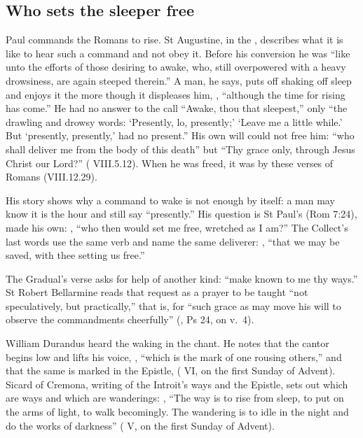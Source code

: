 \subsection{Who sets the sleeper free}

Paul commands the Romans to rise. St Augustine, in the ,
describes what it is like to hear such a command and not obey it. Before his
conversion he was ``like unto the efforts of those desiring to awake, who,
still overpowered with a heavy drowsiness, are again steeped therein.'' A man,
he says, puts off shaking off sleep and enjoys it the more though it
displeases him, , ``although the
time for rising has come.'' He had no answer to the call ``Awake, thou that
sleepest,'' only ``the drawling and drowsy words: `Presently, lo, presently;'
`Leave me a little while.' But `presently, presently,' had no present.'' His
own will could not free him: ``who shall deliver me from the body of this
death'' but ``Thy grace only, through Jesus Christ our Lord?''
( VIII.5.12). When he was freed, it was by these verses of
Romans (VIII.12.29).

His story shows why a command to wake is not enough by itself: a man may know
it is the hour and still say ``presently.'' His question is St Paul's (Rom
7:24), made his own: , ``who then would
set me free, wretched as I am?'' The Collect's last words use the same verb
and name the same deliverer: , ``that we may be saved, with thee setting us free.''

The Gradual's verse asks for help of another kind: ``make known to me thy
ways.'' St Robert Bellarmine reads that request as a prayer to be taught ``not
speculatively, but practically,'' that is, for ``such grace as may move his
will to observe the commandments cheerfully'' (, Ps 24, on
v.~4).

William Durandus heard the waking in the chant. He notes that the cantor
begins  low and lifts his voice, , ``which is the mark of one rousing others,'' and that the same is
marked in the Epistle, 
( VI, on the first Sunday of Advent).
Sicard of Cremona, writing of the Introit's ways and the Epistle, sets out
which are ways and which are wanderings: , ``The way is to rise from sleep, to put on the arms of
light, to walk becomingly. The wandering is to idle in the night and do the
works of darkness'' ( V, on the first Sunday of Advent).

